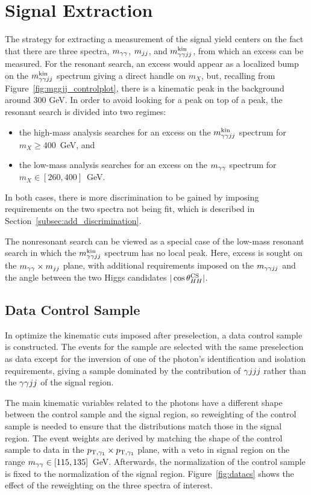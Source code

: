 \section{Signal Extraction\label{sec:extraction}}

The strategy for extracting a measurement of the signal yield centers on the fact that there
are three spectra, $m_{\gamma\gamma}$, $m_{jj}$, and $m_{\gamma\gamma jj}^{\rm kin}$, from which an excess can be measured.
For the resonant search, an excess would appear as a localized bump on the
$m_{\gamma\gamma jj}^{\rm kin}$ spectrum giving a direct handle on $m_X$,
but, recalling from Figure~\ref{fig:mggjj_controlplot}, there is a kinematic peak in the background
around 300 GeV. In order to avoid looking for a peak on top of a peak, the resonant search is
divided into two regimes:
\begin{itemize}
\item the high-mass analysis searches for an excess on the $m_{\gamma\gamma jj}^{\rm kin}$ spectrum for $m_X \ge 400$~GeV, and
\item the low-mass analysis searches for an excess on the $m_{\gamma\gamma}$ spectrum for $m_X \in [260, 400]$~GeV.
\end{itemize}
In both cases, there is more discrimination to be gained by imposing requirements on the two spectra
not being fit, which is described in Section~\ref{subsec:add_discrimination}.

The nonresonant search can be viewed as a special case of the low-mass resonant search in which
the $m_{\gamma\gamma jj}^{\rm kin}$ spectrum has no local peak. Here, excess is sought on the $m_{\gamma\gamma} \times m_{jj}$ plane,
with additional requirements imposed on the $m_{\gamma\gamma jj}$ and the angle between the two Higgs candidates
$|\cos {\theta^{\rm CS}_{HH}}|$.

\subsection{Data Control Sample\label{subsec:dataCS}}

In optimize the kinematic cuts imposed after preselection, a data control sample is constructed.
The events for the sample are selected with the same preselection as data except for
the inversion of one of the photon's identification and isolation requirements, giving a sample
dominated by the contribution of $\gamma jjj$ rather than the $\gamma\gamma jj$ of the signal region.

The main kinematic variables related to the photons have a different shape
between the control sample and the
signal region, so reweighting of the control sample is needed to ensure that the distributions
match those in the signal region. The event weights are derived by matching the shape
of the control sample to data in the $p_{{\rm T},\gamma_1} \times p_{{\rm T},\gamma_1}$ plane,
with a veto in signal region on the range $m_{\gamma\gamma} \in [115, 135]$~GeV. Afterwards,
the normalization of the control sample is fixed to the normalization of the signal
region. Figure~\ref{fig:datacs}
shows the effect of the reweighting on the three spectra of interest.


